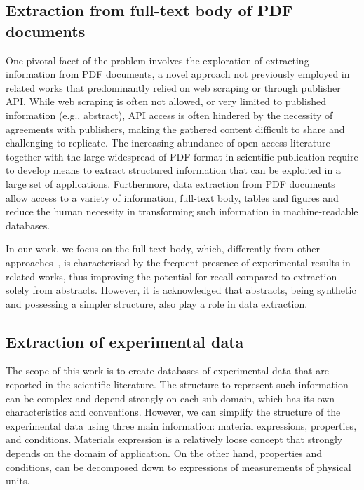 \subsection{Extraction from full-text body of PDF documents}
One pivotal facet of the problem involves the exploration of extracting information from PDF documents, a novel approach not previously employed in related works that predominantly relied on web scraping or through publisher API.
While web scraping is often not allowed, or very limited to published information (e.g., abstract), API access is often hindered by the necessity of agreements with publishers, making the gathered content difficult to share and challenging to replicate.
The increasing abundance of open-access literature~\cite{laakso2011the} together with the large widespread of PDF format in scientific publication require to develop means to extract structured information that can be exploited in a large set of applications. 
Furthermore, data extraction from PDF documents allow access to a variety of information, full-text body, tables and figures and reduce the human necessity in transforming such information in machine-readable databases.

In our work, we focus on the full text body, which, differently from other approaches~\cite{yamaguchi-etal-2020-sc}, is characterised by the frequent presence of experimental results in related works, thus improving the potential for recall compared to extraction solely from abstracts. 
However, it is acknowledged that abstracts, being synthetic and possessing a simpler structure, also play a role in data extraction.

\subsection{Extraction of experimental data}

The scope of this work is to create databases of experimental data that are reported in the scientific literature. 
The structure to represent such information can be complex and depend strongly on each sub-domain, which has its own characteristics and conventions. 
However, we can simplify the structure of the experimental data using three main information: material expressions, properties, and conditions. 
Materials expression is a relatively loose concept that strongly depends on the domain of application. On the other hand, properties and conditions, can be decomposed down to expressions of measurements of physical units. 

